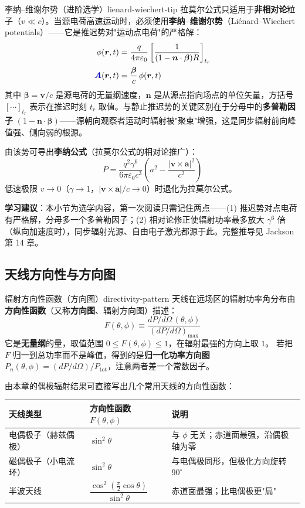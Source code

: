 \documentclass[11pt,a4paper,openany,oneside]{book}
\newcommand{\vecA}{\textcolor{blue!70!black}{\vect{A}}}
\newcommand{\eps}{\varepsilon}
\newcommand{\vect}[1]{\bm{#1}}
\begin{document}
\begin{tip}{李纳--维谢尔势（进阶选学）}{lienard-wiechert-tip}
拉莫尔公式只适用于\textbf{非相对论}粒子（$v \ll c$）。当源电荷高速运动时，必须使用\textbf{李纳--维谢尔势}（Liénard--Wiechert potentials）——它是推迟势对"运动点电荷"的严格解：
\begin{align}
\phi(\vect{r},t) &= \frac{q}{4\pi\eps_0}\left[\frac{1}{(1 - \vect{n}\cdot\bm{\beta})R}\right]_{t_r} \\
\vecA(\vect{r},t) &= \frac{\bm{\beta}}{c}\,\phi(\vect{r},t)
\end{align}
其中 $\bm{\beta} = \vect{v}/c$ 是源电荷的无量纲速度，$\vect{n}$ 是从源点指向场点的单位矢量，方括号 $[\cdots]_{t_r}$ 表示在推迟时刻 $t_r$ 取值。与静止推迟势的关键区别在于分母中的\textbf{多普勒因子} $(1-\vect{n}\cdot\bm{\beta})$——源朝向观察者运动时辐射被"聚束"增强，这是同步辐射前向峰值强、侧向弱的根源。

由该势可导出\textbf{李纳公式}（拉莫尔公式的相对论推广）：
\[
P = \frac{q^2\gamma^6}{6\pi\eps_0 c^3}\left(a^2 - \frac{|\vect{v}\times\vect{a}|^2}{c^2}\right)
\]
低速极限 $v\to 0$（$\gamma\to 1$，$|\vect{v}\times\vect{a}|/c \to 0$）时退化为拉莫尔公式。

\textbf{学习建议}：本小节为选学内容，第一次阅读只需记住两点——(1) 推迟势对点电荷有严格解，分母多一个多普勒因子；(2) 相对论修正使辐射功率最多放大 $\gamma^6$ 倍（纵向加速度时），同步辐射光源、自由电子激光都源于此。完整推导见 Jackson 第 14 章。
\end{tip}

\subsection{天线方向性与方向图}

\begin{definition}{辐射方向性函数（方向图）}{directivity-pattern}
天线在远场区的辐射功率角分布由\textbf{方向性函数}（又称\textbf{方向图}、辐射方向图）描述：
\[
F(\theta,\phi) \equiv \frac{dP/d\Omega\,(\theta,\phi)}{\left(dP/d\Omega\right)_{\max}}
\]
它是\textbf{无量纲}的量，取值范围 $0 \le F(\theta,\phi) \le 1$，在辐射最强的方向上取 $1$。
若把 $F$ 归一到总功率而不是峰值，得到的是\textbf{归一化功率方向图}
$P_n(\theta,\phi) = (dP/d\Omega)/P_{\text{tot}}$，注意两者差一个常数因子。
\end{definition}

由本章的偶极辐射结果可直接写出几个常用天线的方向性函数：

\begin{center}
\small
\begin{tabular}{@{}lll@{}}
\toprule
\textbf{天线类型} & \textbf{方向性函数 $F(\theta,\phi)$} & \textbf{说明} \\
\midrule
电偶极子（赫兹偶极） & $\sin^2\theta$ & 与 $\phi$ 无关；赤道面最强，沿偶极轴为零 \\
磁偶极子（小电流环） & $\sin^2\theta$ & 与电偶极同形，但极化方向旋转 $90^\circ$ \\
半波天线 & $\dfrac{\cos^2\!\left(\frac{\pi}{2}\cos\theta\right)}{\sin^2\theta}$ & 赤道面最强；比电偶极更"扁" \\
\bottomrule
\end{tabular}
\end{center}
\end{document}

